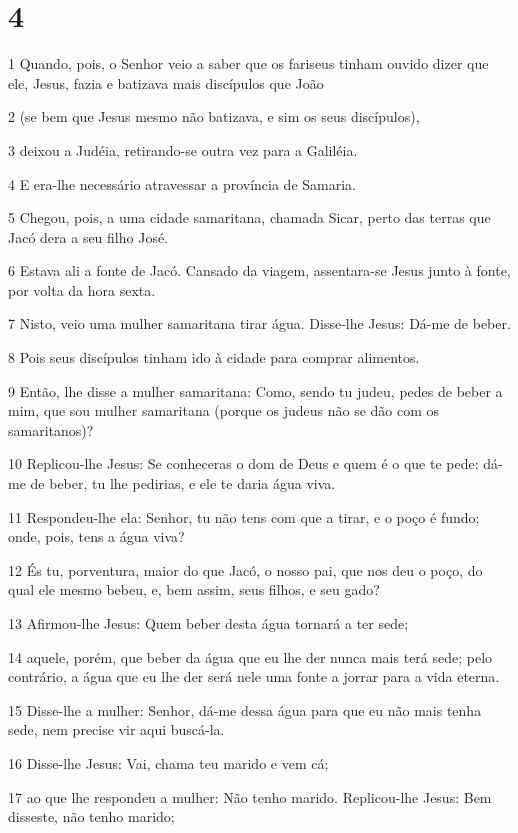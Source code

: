 \chapter{4}

\par 1 Quando, pois, o Senhor veio a saber que os fariseus tinham ouvido dizer que ele, Jesus, fazia e batizava mais discípulos que João
\par 2 (se bem que Jesus mesmo não batizava, e sim os seus discípulos),
\par 3 deixou a Judéia, retirando-se outra vez para a Galiléia.
\par 4 E era-lhe necessário atravessar a província de Samaria.
\par 5 Chegou, pois, a uma cidade samaritana, chamada Sicar, perto das terras que Jacó dera a seu filho José.
\par 6 Estava ali a fonte de Jacó. Cansado da viagem, assentara-se Jesus junto à fonte, por volta da hora sexta.
\par 7 Nisto, veio uma mulher samaritana tirar água. Disse-lhe Jesus: Dá-me de beber.
\par 8 Pois seus discípulos tinham ido à cidade para comprar alimentos.
\par 9 Então, lhe disse a mulher samaritana: Como, sendo tu judeu, pedes de beber a mim, que sou mulher samaritana (porque os judeus não se dão com os samaritanos)?
\par 10 Replicou-lhe Jesus: Se conheceras o dom de Deus e quem é o que te pede: dá-me de beber, tu lhe pedirias, e ele te daria água viva.
\par 11 Respondeu-lhe ela: Senhor, tu não tens com que a tirar, e o poço é fundo; onde, pois, tens a água viva?
\par 12 És tu, porventura, maior do que Jacó, o nosso pai, que nos deu o poço, do qual ele mesmo bebeu, e, bem assim, seus filhos, e seu gado?
\par 13 Afirmou-lhe Jesus: Quem beber desta água tornará a ter sede;
\par 14 aquele, porém, que beber da água que eu lhe der nunca mais terá sede; pelo contrário, a água que eu lhe der será nele uma fonte a jorrar para a vida eterna.
\par 15 Disse-lhe a mulher: Senhor, dá-me dessa água para que eu não mais tenha sede, nem precise vir aqui buscá-la.
\par 16 Disse-lhe Jesus: Vai, chama teu marido e vem cá;
\par 17 ao que lhe respondeu a mulher: Não tenho marido. Replicou-lhe Jesus: Bem disseste, não tenho marido;
